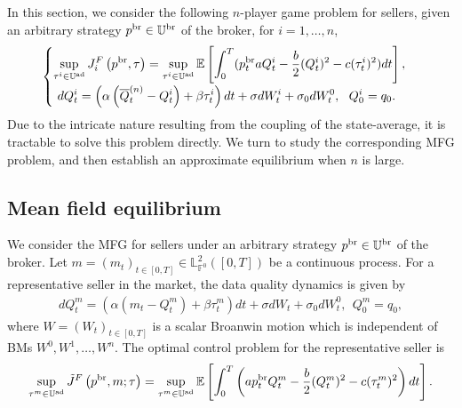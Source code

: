 \documentclass[11pt]{article}
\numberwithin{equation}{section}
\begin{document}
In this section, we consider the following $n$-player game problem for sellers, given an arbitrary strategy $p^{\rm br} \in \mathbb{U}^{\rm br}$ of the broker, for $i=1,\ldots,n$,
\begin{align}\label{npg}
\begin{cases}
\displaystyle\sup_{\tau^i\in \mathbb{U}^{\rm ad}}J_i^F\left(p^{{\rm br}}, \tau\right)=\sup_{\tau^i\in \mathbb{U}^{\rm ad}}\mathbb{E}\left[\int_0^T(p_t^{{\rm br}}a Q_t^i-\frac{b }{2}(Q_t^i)^2-c  (\tau_t^i)^2)dt\right],\\[1em]
\displaystyle~ d Q_t^i=\left(\alpha\left(\overline{Q}_t^{(n)}-Q_t^i\right)+\beta \tau_t^i\right)dt+\sigma d W_t^i+\sigma_0dW_t^0,~~ Q_0^i=q_0.		
\end{cases}
\end{align}
Due to the intricate nature resulting from the coupling of the state-average, it is tractable to solve this problem directly. We turn to study the corresponding MFG problem, and then establish an approximate equilibrium when $n$ is large. 
	
	
\subsection{Mean field equilibrium}\label{sec:MFE}

We consider the MFG for sellers under an arbitrary strategy $p^{{\rm br}}\in\mathbb{U}^{\rm br}$ of the broker. Let $m = (m_t)_{t \in [0, T]}\in \mathbb{L}_{\mathbb{F}^0}^2([0,T])$ be a continuous process. For a representative seller in the market, the data quality dynamics is given by 
\begin{align}\label{mfg1}
dQ_t^m=\left(\alpha\left(m_t-Q_t^m\right)+\beta\tau_t^m\right)dt+\sigma d W_t+\sigma_0dW_t^0,~~Q_0^m=q_0,
\end{align}
where $W=(W_t)_{t\in[0,T]}$ is a scalar Broanwin motion which is independent of BMs $W^0,W^1,\ldots,W^n$. The optimal control problem for the representative seller is
\begin{align}\label{mfg2}
\sup_{\tau^m\in \mathbb{U}^{\rm ad}}\tilde{J}^F\left(p^{{\rm br}}, m; \tau\right)=\sup_{\tau^m\in \mathbb{U}^{\rm ad}}\mathbb{E}\left[\int_0^T\left(ap_t^{{\rm br}}Q_t^m-\frac{b}{2}(Q_t^m)^2 -c (\tau_t^m)^2\right)dt\right].
\end{align}
\end{document}
